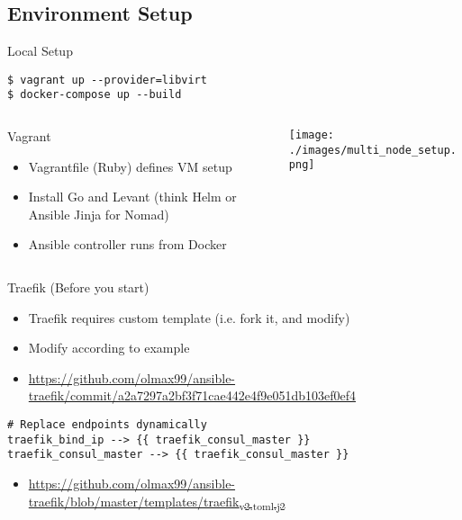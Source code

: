 \documentclass[presentation]{beamer}
\begin{document}
\subsection{Environment Setup}
\label{sec:org786c7ef}
\begin{frame}[label={sec:org139def7},fragile]{Local Setup}
 \begin{verbatim}
$ vagrant up --provider=libvirt
$ docker-compose up --build
\end{verbatim}
\begin{columns}
\begin{column}{0.4\columnwidth}
\begin{block}{Vagrant}
\begin{itemize}
\item \alert{Vagrantfile} (Ruby) defines VM setup
\item Install Go and Levant (think Helm or Ansible Jinja for Nomad)
\item Ansible controller runs from Docker
\end{itemize}
\end{block}
\end{column}
\begin{column}{0.6\columnwidth}
\begin{example}
\begin{center}
\texttt{[image: ./images/multi\_node\_setup.png]}
\end{center}
\end{example}
\end{column}
\end{columns}
\end{frame}

\begin{frame}[label={sec:org19f2716},fragile]{Traefik (Before you start)}
 \begin{itemize}
\item Traefik requires custom template (i.e. fork it, and modify)
\item Modify according to example
\item \href{https://github.com/olmax99/ansible-traefik/commit/a2a7297a2bf3f71cae442e4f9e051db103ef0ef4}{https://github.com/olmax99/ansible-traefik/commit/a2a7297a2bf3f71cae442e4f9e051db103ef0ef4}
\end{itemize}

\begin{verbatim}
# Replace endpoints dynamically
traefik_bind_ip --> {{ traefik_consul_master }}
traefik_consul_master --> {{ traefik_consul_master }}
\end{verbatim}
\begin{itemize}
\item \href{https://github.com/olmax99/ansible-traefik/blob/master/templates/traefik\_v2.toml.j2}{https://github.com/olmax99/ansible-traefik/blob/master/templates/traefik\textsubscript{v2.toml.j2}}
\end{itemize}
\end{frame}
\end{document}
